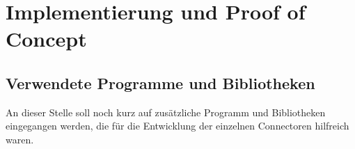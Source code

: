 
\chapter{Implementierung und Proof of Concept} %
\label{cha:implementierung_und_evaluation}


\section{Verwendete Programme und Bibliotheken} %
\label{sec:verwendete_bibliotheken_und_programme}

An dieser Stelle soll noch kurz auf zusätzliche Programm und Bibliotheken eingegangen werden, die für die Entwicklung der einzelnen Connectoren hilfreich waren. 

